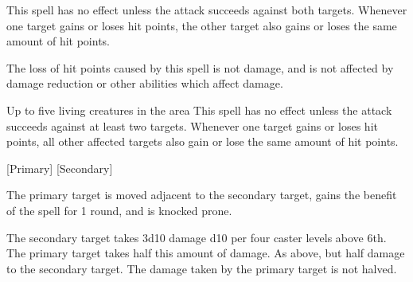 \begin{spellheader}
\end{spellheader}
\begin{spelleffects}
    \spelldur{\durshort}
    \spellspecial This spell has no effect unless the attack succeeds against both targets.
    \spellsuccess Whenever one target gains or loses hit points, the other target also gains or loses the same amount of hit points.
\end{spelleffects}
\begin{spellfooter}
    \spellnotes The loss of hit points caused by this spell is not damage, and is not affected by damage reduction or other abilities which affect damage.
\end{spellfooter}

\begin{spellheader}
    \spelldur{\durshort}
\end{spellheader}
\begin{spelleffects}
    \begin{spelltargets}{Up to five living creatures in the area}
        \spellspecial This spell has no effect unless the attack succeeds against at least two targets.
        \spellsuccess Whenever one target gains or loses hit points, all other affected targets also gain or lose the same amount of hit points.
    \end{spelltargets}
\end{spelleffects}

\begin{spellheader}
    \spellrng{\rngclose}
    [Primary]
    [Secondary]
\end{spellheader}
\begin{spelleffects}
    \spelleffect The primary target is moved adjacent to the secondary target, gains the benefit of the  spell for 1 round, and is knocked prone.
    \begin{spellmargin}
        \spellsuccess The secondary target takes 3d10 damage \add d10 per four caster levels above 6th. The primary target takes half this amount of damage.
        \spellfailure As above, but half damage to the secondary target. The damage taken by the primary target is not halved.
    \end{spellmargin}
\end{spelleffects}

